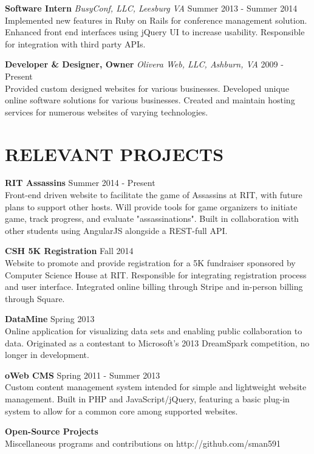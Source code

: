 \documentclass[line]{res}
\begin{document}
\begin{resume}
  \textbf{Software Intern}
  \textit{BusyConf, LLC, Leesburg VA}
  \hfill
  Summer 2013 - Summer 2014\\
  Implemented new features in Ruby on Rails for conference management solution.
  Enhanced front end interfaces using jQuery UI to increase usability.
  Responsible for integration with third party APIs.

  \textbf{Developer \& Designer, Owner}
  \textit{Olivera Web, LLC, Ashburn, VA}
  \hfill
  2009 - Present\\
  Provided custom designed websites for various businesses.
  Developed unique online software solutions for various businesses.
  Created and maintain hosting services for numerous websites of varying technologies.

\section{RELEVANT PROJECTS}

  \textbf{RIT Assassins}
  \hfill
  Summer 2014 - Present
  \\
  Front-end driven website to facilitate the game of Assassins at RIT, with future plans to support other hosts.
  Will provide tools for game organizers to initiate game, track progress, and evaluate "assassinations". Built in collaboration with other students using AngularJS alongside a REST-full API.

  \textbf{CSH 5K Registration}
  \hfill
  Fall 2014
  \\
  Website to promote and provide registration for a 5K fundraiser sponsored by Computer Science House at RIT.
  Responsible for integrating registration process and user interface.
  Integrated online billing through Stripe and in-person billing through Square.

  \textbf{DataMine}
  \hfill
  Spring 2013
  \\
  Online application for visualizing data sets and enabling public collaboration to data.
  Originated as a contestant to Microsoft's 2013 DreamSpark competition, no longer in development.

  \textbf{oWeb CMS}
  \hfill
  Spring 2011 - Summer 2013
  \\
  Custom content management system intended for simple and lightweight website management.
  Built in PHP and JavaScript/jQuery, featuring a basic plug-in system to allow for a common core among supported websites.

  \textbf{Open-Source Projects}
  \\
  Miscellaneous programs and contributions on http://github.com/sman591


\end{resume}
\end{document}

